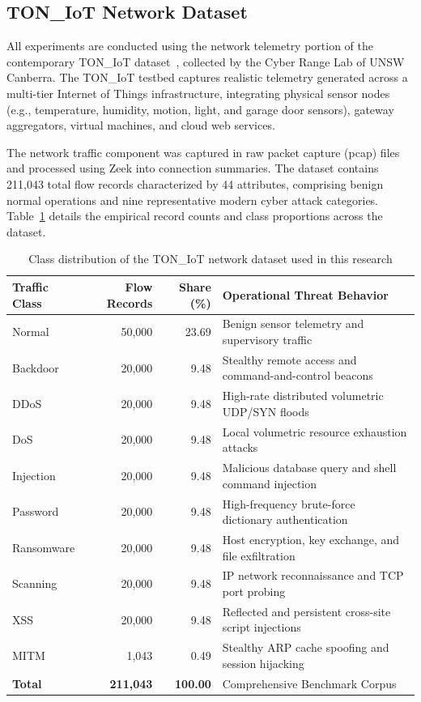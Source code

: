 \subsection{TON\_IoT Network Dataset}
\label{subsec:toniot_dataset}

All experiments are conducted using the network telemetry portion of the contemporary TON\_IoT dataset~\cite{alshammari2020toniot}, collected by the Cyber Range Lab of UNSW Canberra. The TON\_IoT testbed captures realistic telemetry generated across a multi-tier Internet of Things infrastructure, integrating physical sensor nodes (e.g., temperature, humidity, motion, light, and garage door sensors), gateway aggregators, virtual machines, and cloud web services.

The network traffic component was captured in raw packet capture (pcap) files and processed using Zeek into connection summaries. The dataset contains 211{,}043 total flow records characterized by 44 attributes, comprising benign normal operations and nine representative modern cyber attack categories. Table~\ref{tab:class_distribution_pw} details the empirical record counts and class proportions across the dataset.

\begin{table}[!t]
\centering
\small
\setlength{\tabcolsep}{5pt}
\renewcommand{\arraystretch}{1.2}
\caption{Class distribution of the TON\_IoT network dataset used in this research}
\label{tab:class_distribution_pw}
\begin{tabular}{|l|r|r|p{7.2cm}|}
\hline
\textbf{Traffic Class} & \textbf{Flow Records} & \textbf{Share (\%)} & \textbf{Operational Threat Behavior} \\ \hline
Normal      & 50{,}000 & 23.69 & Benign sensor telemetry and supervisory traffic \\
Backdoor    & 20{,}000 & 9.48  & Stealthy remote access and command-and-control beacons \\
DDoS        & 20{,}000 & 9.48  & High-rate distributed volumetric UDP/SYN floods \\
DoS         & 20{,}000 & 9.48  & Local volumetric resource exhaustion attacks \\
Injection   & 20{,}000 & 9.48  & Malicious database query and shell command injection \\
Password    & 20{,}000 & 9.48  & High-frequency brute-force dictionary authentication \\
Ransomware  & 20{,}000 & 9.48  & Host encryption, key exchange, and file exfiltration \\
Scanning    & 20{,}000 & 9.48  & IP network reconnaissance and TCP port probing \\
XSS         & 20{,}000 & 9.48  & Reflected and persistent cross-site script injections \\
MITM        & 1{,}043  & 0.49  & Stealthy ARP cache spoofing and session hijacking \\ \hline
\textbf{Total} & \textbf{211{,}043} & \textbf{100.00} & Comprehensive Benchmark Corpus \\ \hline
\end{tabular}
\end{table}

